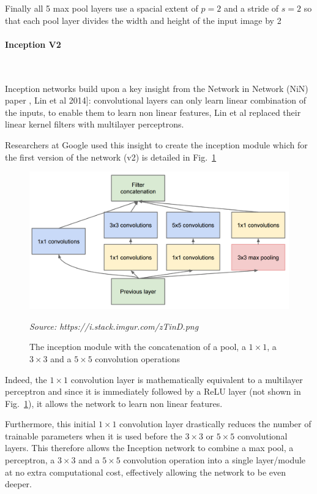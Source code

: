 \documentclass[12pt,twoside]{article}
\newcommand{\source}[1]{\vspace{-3pt} \caption*{ \footnotesize{\textit{Source: {#1}}}} }
\newcommand{\para}[1]{\paragraph{#1}\mbox{}\\}
\begin{document}
Finally all 5 max pool layers use a spacial extent of $p=2$ and a stride of
$s=2$ so that each pool layer divides the width and height of the input image
by 2 
 
\para{Inception V2}\label{para:inception_v2}

Inception networks build upon a key insight from the Network in Network
(NiN) paper \cite{RefWorks:30}, Lin et al 2014]: convolutional layers can only learn linear
combination of the inputs, to enable them to learn non linear
features, Lin et al replaced their linear kernel filters with multilayer
perceptrons. 

Researchers at Google used this insight to create the inception
module which for the first version of the network (v2) is detailed in
Fig.~\ref{fig:inception_module}

\begin{figure}[ht]
  \centering
  \includegraphics[scale=0.3]{figures/inception_module.png}
  \caption{The inception module with the concatenation of a pool, a $1 \times
  1$, a $3 \times 3$ and a $5 \times 5$ convolution operations}
  \source{https://i.stack.imgur.com/zTinD.png}
  \label{fig:inception_module}
\end{figure}

Indeed, the $1\times 1$ convolution layer is mathematically equivalent to a
multilayer perceptron and since it is immediately followed by a ReLU layer
(not shown in Fig.~\ref{fig:inception_module}), it allows the network to learn
non linear features. 

Furthermore, this initial $1 \times 1$ convolution layer drastically reduces
the number of trainable parameters when it is used before the $3 \times 3$ or
$5 \times 5$ convolutional layers. This therefore allows the Inception network to
combine a max pool, a perceptron, a $3 \times 3$ and a $5 \times 5$ convolution
operation into a single layer/module at no extra computational cost,
effectively allowing the network to be even deeper.
\end{document}
